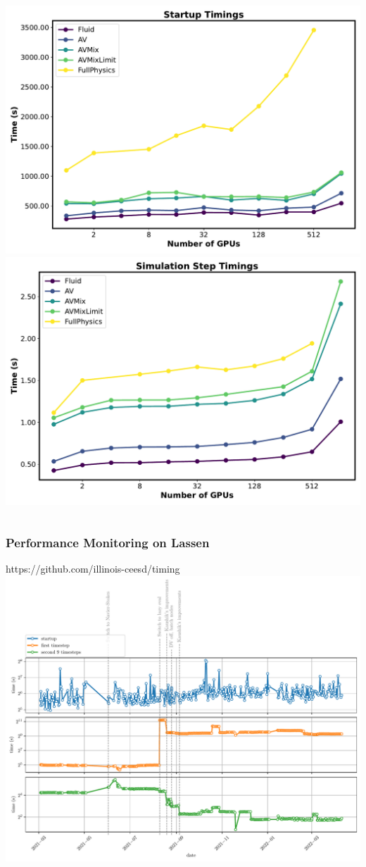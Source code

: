 \begin{frame}
\begin{columns}[T]
    \begin{column}{0.5\textwidth}
      \includegraphics[width=.7\textwidth]{Figures/StartupTimes.pdf}
      \includegraphics[width=.7\textwidth]{Figures/SimulationStepTimes.pdf}
    \end{column}
  \end{columns}
\end{frame}



\begin{frame}\frametitle{Performance Monitoring on Lassen}
\begin{center}
https://github.com/illinois-ceesd/timing\\
\includegraphics[width=.6\textwidth]{Figures/mtc/nozzle-lazy-full.pdf}
\end{center}
\end{frame}

